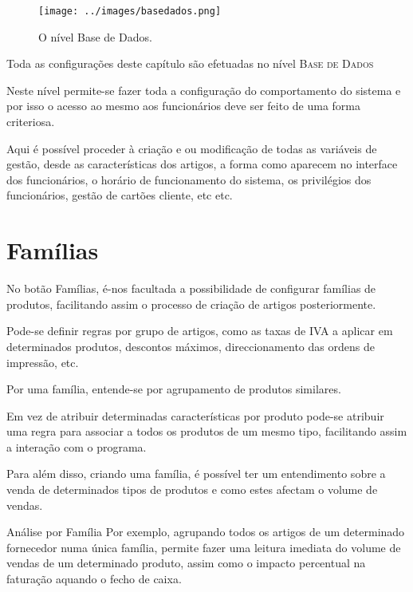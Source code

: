 \documentclass[a4paper,11pt,openany]{memoir}
\begin{document}
\begin{figure}[h]
\begin{center}
\texttt{[image: ../images/basedados.png]}
\caption[Submanifold]{O nível Base de Dados.}
\label{basedados}
\end{center}
\end{figure}


Toda as configurações deste capítulo são efetuadas no nível \textsc{Base de Dados}

Neste nível permite-se fazer toda a configuração do comportamento do sistema e por isso o acesso
ao mesmo aos funcionários deve ser feito de uma forma criteriosa.

Aqui é possível proceder à criação e ou modificação de todas as variáveis de gestão, desde as 
características dos artigos, a forma como aparecem no interface dos funcionários, o horário
de funcionamento do sistema, os privilégios dos funcionários, gestão de cartões cliente, etc etc.






\section{Famílias}

No botão Famílias, é-nos facultada a possibilidade de configurar famílias de produtos,
facilitando assim o processo de criação de artigos posteriormente.


Pode-se definir regras por grupo de artigos, como as taxas de IVA a aplicar 
em determinados produtos, descontos máximos, direccionamento das ordens de impressão, etc.


Por uma família, entende-se por agrupamento de produtos similares. 

Em vez de atribuir determinadas características por produto pode-se atribuir uma regra para associar a todos os produtos de um mesmo tipo, facilitando 
assim a interação com o programa.

Para além disso, criando uma família, é possível ter um entendimento sobre a venda de determinados 
tipos de produtos e como estes afectam o volume de vendas. 



\begin{bclogo}[couleur=blue!10,arrondi=0.1,logo=\bccrayon,ombre=true]{Análise por Família}
Por exemplo, agrupando todos os artigos de um determinado fornecedor numa única família, 
permite fazer uma leitura imediata do volume de vendas de um determinado produto, 
assim como o impacto percentual na faturação aquando o fecho de caixa.
\end{bclogo}
\end{document}

